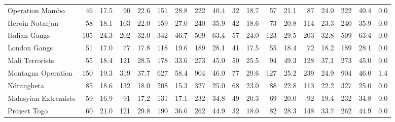 \begin{tabular}{lrrrrrrrrrrrrrrrrl}
Operation Mambo      &                46 &  17.5 &   90 &  22.6 &  151 &  28.8 &  222 &  40.4 &               32 &   18.7 &   57 &   21.1 &   87 &   24.0 &  222 &  40.4 &        0.0 \\
Heroin Natarjan      &                58 &  18.1 &  103 &  22.0 &  159 &  27.0 &  240 &  35.9 &               42 &   18.6 &   73 &   20.8 &  114 &   23.3 &  240 &  35.9 &        0.0 \\
Italian Gangs        &               105 &  24.3 &  202 &  32.0 &  342 &  46.7 &  509 &  63.4 &               57 &   24.0 &  123 &   29.5 &  203 &   32.8 &  509 &  63.4 &        0.0 \\
London Gangs         &                51 &  17.0 &   77 &  17.8 &  118 &  19.6 &  189 &  28.1 &               41 &   17.5 &   55 &   18.4 &   72 &   18.2 &  189 &  28.1 &        0.0 \\
Mali Terrorists      &                55 &  18.4 &  121 &  28.5 &  178 &  33.6 &  273 &  45.0 &               50 &   25.5 &   94 &   49.3 &  128 &   37.1 &  273 &  45.0 &        0.0 \\
Montagna Operation   &               150 &  19.3 &  319 &  37.7 &  627 &  58.4 &  904 &  46.0 &               77 &   29.6 &  127 &   25.2 &  239 &   24.9 &  904 &  46.0 &        1.4 \\
Ndrangheta           &                85 &  18.6 &  132 &  18.0 &  208 &  15.3 &  327 &  25.0 &               68 &   23.0 &   88 &   22.8 &  113 &   22.2 &  327 &  25.0 &        0.0 \\
Malasyian Extremists &                59 &  16.9 &   91 &  17.2 &  131 &  17.1 &  232 &  34.8 &               49 &   20.3 &   69 &   20.0 &   92 &   19.4 &  232 &  34.8 &        0.0 \\
Project Togo         &                60 &  21.0 &  121 &  29.8 &  190 &  36.6 &  262 &  44.9 &               32 &   18.0 &   82 &   28.3 &  148 &   33.7 &  262 &  44.9 &        0.0 \\
\bottomrule
\end{tabular}

